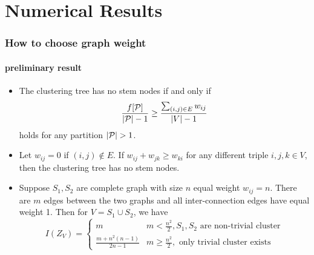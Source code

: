 \documentclass[notheorems]{beamer}
\begin{document}
\section{Numerical Results}
\frame{\tableofcontents[currentsection]}
\begin{frame}
	\frametitle{How to choose graph weight}
	\framesubtitle{preliminary result}
	\begin{proposition}
		\begin{itemize}
			\item The clustering tree has no stem nodes if and only if
			\begin{equation}
			\frac{f[\mathcal{P}]}{\lvert\mathcal{P}\rvert-1} \geq \frac{\sum_{(i,j) \in E} w_{ij}}{\lvert V\rvert-1}				
			\end{equation}
			holds for any partition $\lvert\mathcal{P}\rvert > 1$.
			\item Let $w_{ij}=0$ if $(i,j)\not\in E$. If $w_{ij} + w_{jk} \geq w_{ki}$ for any different triple $i, j, k \in V$, then the clustering tree has no stem nodes.
			\item Suppose $S_1, S_2 $ are complete graph with size $n$ equal weight $w_{ij}=n$. There are $m$ edges between the two graphs and all inter-connection edges have equal weight 1. Then for $V=S_1\cup S_2$, we have
			\begin{equation}
				I(Z_V) = \begin{cases}
					m & m <\frac{n^2}{2}, S_1,S_2 \textrm{ are non-trivial cluster} \\
					\frac{m+n^2(n-1)}{2n-1} & m\geq \frac{n^2}{2}, \textrm{ only trivial cluster exists} 
				\end{cases}
			\end{equation}
				
		\end{itemize}
	\end{proposition}
\end{frame}
\end{document}
